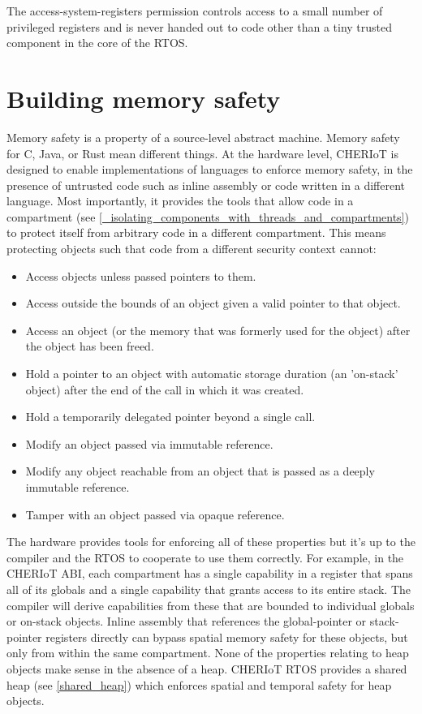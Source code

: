 The access-system-registers permission controls access to a small number of privileged registers and is never handed out to code other than a tiny trusted component in the core of the RTOS.

\section{Building memory safety}

Memory safety is a property of a source-level abstract machine.
Memory safety for C, Java, or Rust mean different things.
At the hardware level, CHERIoT is designed to enable implementations of languages to enforce memory safety, in the presence of untrusted code such as inline assembly or code written in a different language.
Most importantly, it provides the tools that allow code in a compartment (see \ref{_isolating_components_with_threads_and_compartments}) to protect itself from arbitrary code in a different compartment.
This means protecting objects such that code from a different security context cannot:

\begin{itemize}
	\item{Access objects unless passed pointers to them.}
	\item{Access outside the bounds of an object given a valid pointer to that object.}
	\item{Access an object (or the memory that was formerly used for the object) after the object has been freed.}
	\item{Hold a pointer to an object with automatic storage duration (an 'on-stack' object) after the end of the call in which it was created.}
	\item{Hold a temporarily delegated pointer beyond a single call.}
	\item{Modify an object passed via immutable reference.}
	\item{Modify any object reachable from an object that is passed as a deeply immutable reference.}
	\item{Tamper with an object passed via opaque reference.}
\end{itemize}

The hardware provides tools for enforcing all of these properties but it's up to the compiler and the RTOS to cooperate to use them correctly.
For example, in the CHERIoT ABI, each compartment has a single capability in a register that spans all of its globals and a single capability that grants access to its entire stack.
The compiler will derive capabilities from these that are bounded to individual globals or on-stack objects.
Inline assembly that references the global-pointer or stack-pointer registers directly can bypass spatial memory safety for these objects, but only from within the same compartment.
None of the properties relating to heap objects make sense in the absence of a heap.
CHERIoT RTOS provides a shared heap (see \ref{shared_heap}) which enforces spatial and temporal safety for heap objects.

